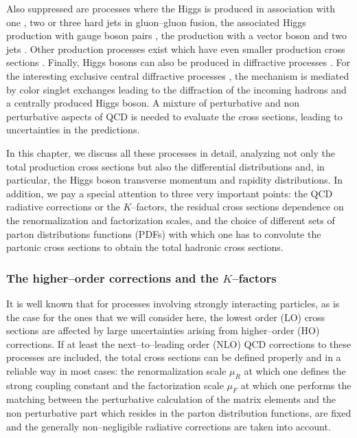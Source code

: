 Also suppressed are processes where the Higgs is produced in association with 
one \cite{pp-Hgg-PT,pp-Hgg-PT2}, two \cite{pp-ggHqq-Limit,pp-ggHqq} or three 
\cite{pp-ggHqqq} hard jets in gluon--gluon
fusion, the associated Higgs production with gauge boson pairs
\cite{pp-HVV,DWP}, the production with a vector  boson and two jets
\cite{pp-HVqq,pp-HVqq-Rain,DWP}. Other production processes  exist which have
even smaller production cross sections
\cite{pp-Hgamma,pp-qqHH,pp-qqttHH0,pp-qqttHH,pp-t-H,pp-t-H2,Three-Body2}. 
Finally, Higgs bosons can also be
produced in diffractive processes 
\cite{BL-diffr,diffr1,diffr2,Valery-myths,diffr-Houches}. For the interesting 
exclusive central
diffractive processes \cite{diffr2,Valery-myths,diffr-Houches}, the
mechanism is mediated by color singlet exchanges leading to the diffraction of
the incoming hadrons and a centrally produced Higgs boson. A
mixture of perturbative and non perturbative aspects of QCD is needed to
evaluate the cross sections, leading to uncertainties in the 
predictions.\s

In this chapter, we discuss all these processes in detail, analyzing not only 
the total production cross sections but also the differential  distributions 
and, in particular, the Higgs boson transverse momentum and rapidity 
distributions. In addition, we pay a special attention to three very important 
points: the
QCD radiative corrections or the $K$--factors, the residual cross sections
dependence on the renormalization and factorization  scales, and the choice of
different sets of parton distributions functions (PDFs) with which one has to
convolute the partonic cross sections to obtain the total hadronic cross
sections.

\vspace*{-2mm}
\subsubsection{The higher--order corrections and the $K$--factors} 

It is well known that for processes involving strongly interacting particles,
as is the case for the ones that we will consider here, the lowest order (LO)
cross  sections are affected by large uncertainties arising from higher--order
(HO) corrections. If at least the next--to--leading order (NLO) QCD corrections
to these processes are included, the total cross sections can be defined
properly and in a reliable way in most cases: the renormalization scale
$\mu_R$ at which one defines the strong coupling constant and the factorization
scale $\mu_F$ at which one performs the matching between the perturbative
calculation of the matrix elements and the non perturbative part which resides
in the parton distribution functions, are fixed and the generally
non--negligible radiative corrections are taken into account. \s

